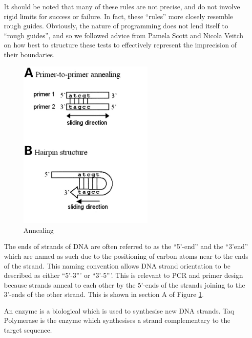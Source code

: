 It should be noted that many of these rules are not precise, and do
not involve rigid limits for success or failure.
In fact, these ``rules'' more closely resemble rough guides.
Obviously, the nature of programming does not lend itself to ``rough
guides'', and so we followed advice from Pamela Scott and Nicola
Veitch on how best to structure these tests to effectively represent
the imprecision of their boundaries.

\begin{figure}[!t]
  \begin{center}
    \includegraphics[width=0.6\textwidth]{./images/other/annealing.jpg}
    \caption{
      \label{fig:other:anneal}
      Annealing	
    }
  \end{center}
\end{figure}

The ends of strands of DNA are often referred to as the ``5'-end'' and
the ``3'end'' which are named as such due to the positioning of carbon
atoms near to the ends of the strand. This naming convention allows DNA
strand orientation to be described as either ``5'-3''' or ``3'-5'''.
This is relevant to PCR and primer design because strands anneal to
each other by the 5'-ends of the strands joining to the 3'-ends of the
other strand. This is shown in section A of Figure
\ref{fig:other:anneal}.

An enzyme is a biological which is used to synthesise new DNA
strands. Taq Polymerase is the enzyme which synthesises a strand
complementary to the target sequence.











